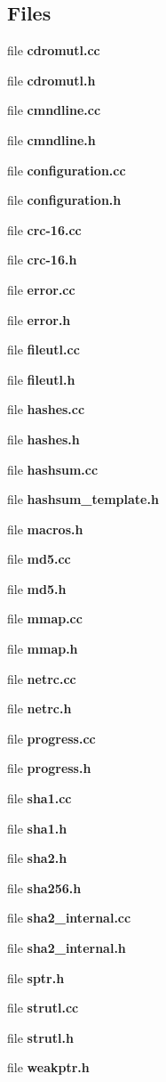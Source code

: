 \subsection*{\-Files}
\begin{DoxyCompactItemize}
\item 
file {\bfseries cdromutl.\-cc}
\item 
file {\bfseries cdromutl.\-h}
\item 
file {\bfseries cmndline.\-cc}
\item 
file {\bfseries cmndline.\-h}
\item 
file {\bfseries configuration.\-cc}
\item 
file {\bfseries configuration.\-h}
\item 
file {\bfseries crc-\/16.\-cc}
\item 
file {\bfseries crc-\/16.\-h}
\item 
file {\bfseries error.\-cc}
\item 
file {\bfseries error.\-h}
\item 
file {\bfseries fileutl.\-cc}
\item 
file {\bfseries fileutl.\-h}
\item 
file {\bfseries hashes.\-cc}
\item 
file {\bfseries hashes.\-h}
\item 
file {\bfseries hashsum.\-cc}
\item 
file {\bfseries hashsum\-\_\-template.\-h}
\item 
file {\bfseries macros.\-h}
\item 
file {\bfseries md5.\-cc}
\item 
file {\bfseries md5.\-h}
\item 
file {\bfseries mmap.\-cc}
\item 
file {\bfseries mmap.\-h}
\item 
file {\bfseries netrc.\-cc}
\item 
file {\bfseries netrc.\-h}
\item 
file {\bfseries progress.\-cc}
\item 
file {\bfseries progress.\-h}
\item 
file {\bfseries sha1.\-cc}
\item 
file {\bfseries sha1.\-h}
\item 
file {\bfseries sha2.\-h}
\item 
file {\bfseries sha256.\-h}
\item 
file {\bfseries sha2\-\_\-internal.\-cc}
\item 
file {\bfseries sha2\-\_\-internal.\-h}
\item 
file {\bfseries sptr.\-h}
\item 
file {\bfseries strutl.\-cc}
\item 
file {\bfseries strutl.\-h}
\item 
file {\bfseries weakptr.\-h}
\end{DoxyCompactItemize}
